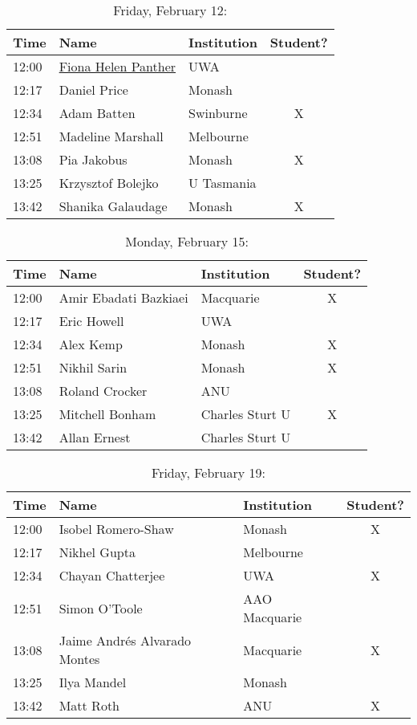 \documentclass[amsmath,onecolumn]{revtex4-1}
\begin{document}
\begin{table}[!htbp]
	\centering
	\caption{Friday, February 12:}
\begin{tabular}{| l | l | l | c |}
	\hline
	Time & Name  & Institution & Student? \\ 		
	\hline
	12:00 & \href{https://forms.gle/bZz2KNKeq9Sgx4bN7}{Fiona Helen Panther}  & UWA &  \\
	12:17 & Daniel Price & Monash & \\
	12:34 & Adam	Batten & Swinburne & X \\
	12:51 & Madeline	Marshall &  Melbourne & \\
	13:08 & Pia	Jakobus & Monash & X \\
	13:25 & Krzysztof 	Bolejko & U Tasmania  &	\\
	13:42 & Shanika	Galaudage & Monash & X\\
	\hline
\end{tabular}
\end{table}

\begin{table}[!htbp]
	\centering
	\caption{Monday, February 15:}
\begin{tabular}{| l | l | l | c |}
	\hline
	Time & Name  & Institution & Student? \\ 		
	\hline
	12:00 & Amir	Ebadati Bazkiaei & Macquarie & X \\
	12:17 &  Eric	Howell & UWA &\\
	12:34 & Alex	Kemp &  Monash & X\\
	12:51 & Nikhil	Sarin & Monash & X   \\
	13:08 & Roland	Crocker & ANU & \\
	13:25 & Mitchell	Bonham & Charles Sturt U  & X\\
	13:42 & Allan Ernest & Charles Sturt U & \\
	\hline
\end{tabular}
\end{table}

\begin{table}[!htbp]
	\centering
	\caption{Friday, February 19:}
\begin{tabular}{| l | l | l | c |}
	\hline
	Time & Name  & Institution & Student? \\ 		
	\hline
	12:00 &  Isobel	Romero-Shaw & Monash & X\\
	12:17 & Nikhel	Gupta  & Melbourne & \\
	12:34 & Chayan	Chatterjee & UWA  & X \\
	12:51 & Simon	O'Toole &	AAO Macquarie  & \\
	13:08 & Jaime Andr\'{e}s	Alvarado Montes &  Macquarie & X\\
	13:25 & Ilya Mandel & Monash & \\
	13:42 & Matt	Roth & ANU & X\\
	\hline
\end{tabular}
\end{table}
\end{document}

